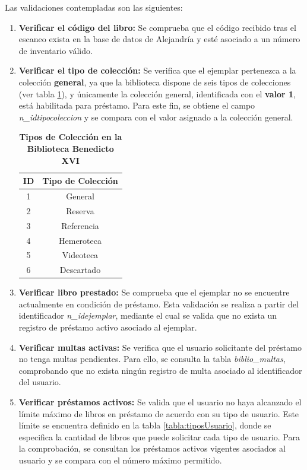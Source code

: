 \documentclass[spanish]{ieee_upb}
\begin{document}
Las validaciones contempladas son las siguientes:
\begin{enumerate}
    \item \textbf{Verificar el código del libro: }Se comprueba que el código recibido tras el escaneo exista en la base de datos de Alejandría y esté asociado a un número de inventario válido.
    \item \textbf{Verificar el tipo de colección:} Se verifica que el ejemplar pertenezca a la colección \textbf{general}, ya que la biblioteca dispone de seis tipos de colecciones (ver tabla \ref{tabla:tiposColeccion}), y únicamente la colección general, identificada con el \textbf{valor 1}, está habilitada para préstamo. Para este fin, se obtiene el campo \textit{n\_idtipocoleccion} y se compara con el valor asignado a la colección general.
    
    \begin{table}[H]
        \centering
        \caption[Nombre en la lista de tablas]{\bfseries Tipos de Colección en la Biblioteca Benedicto XVI}
        \label{tabla:tiposColeccion}
        \begin{tabular}{|c|c|}
            \hline
            \textbf{ID} & \textbf{Tipo de Colección}  \\
            \hline
            1 & General \\ 
            \hline
            2 & Reserva \\ 
            \hline
            3 & Referencia \\ 
            \hline
            4 & Hemeroteca \\
            \hline
            5 & Videoteca \\
            \hline
            6 & Descartado \\
            \hline
        \end{tabular}
    \end{table}
    \item \textbf{Verificar libro prestado: }Se comprueba que el ejemplar no se encuentre actualmente en condición de préstamo. Esta validación se realiza a partir del identificador \textit{n\_idejemplar}, mediante el cual se valida que no exista un registro de préstamo activo asociado al ejemplar.
    \item \textbf{Verificar multas activas: }Se verifica que el usuario solicitante del préstamo no tenga multas pendientes. Para ello, se consulta la tabla \textit{biblio\_multas}, comprobando que no exista ningún registro de multa asociado al identificador del usuario.
    \item \textbf{Verificar préstamos activos: }Se valida que el usuario no haya alcanzado el límite máximo de libros en préstamo de acuerdo con su tipo de usuario. Este límite se encuentra definido en la tabla \ref{tabla:tiposUsuario}, donde se especifica la cantidad de libros que puede solicitar cada tipo de usuario. Para la comprobación, se consultan los préstamos activos vigentes asociados al usuario y se compara con el número máximo permitido.
    

\end{enumerate}
\end{document}
